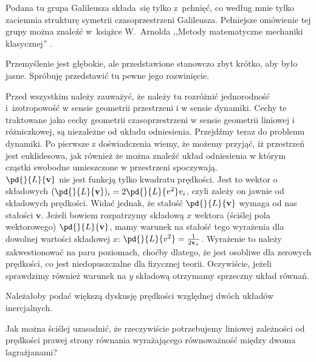\documentclass[a4paper,11pt]{article}
\begin{document}

\start {} Podana tu grupa Galileusza składa~się tylko z~pchnięć,
co według mnie tylko zaciemnia strukturę symetrii czasoprzestrzeni
Galileusza. Pełniejsze omówienie tej grupy można znaleźć w~książce
W.~Arnolda ,,Metody matematyczne mechaniki klasycznej''
\cite{ArnoldMetodyMatematyczneMechanikiKlasycznej1981}.

\vspace{\spaceFour}


\start {} Przemyślenie jest głębokie, ale przedstawione
stanowczo zbyt krótko, aby było jasne. Spróbuję przedstawić tu pewne
jego rozwinięcie.

Przed wszystkim należy zauważyć, że należy tu rozróżnić jednorodność
i~izotropowość w sensie geometrii przestrzeni i w sensie dynamiki.
Cechy te traktowane jako cechy geometrii czasoprzestrzeni w sensie
geometrii liniowej i różniczkowej, są niezależne od układu
odniesienia. Przejdźmy teraz do problemu dynamiki. Po pierwsze z
doświadczenia wiemy, że możemy przyjąć, iż przestrzeń jest
euklidesowa, jak również że można znaleźć układ odniesienia w którym
cząstki swobodne umieszczone w przestrzeni spoczywają. \\
\start {} $\pd{}{ L }{ \mathbf{ v } }$ nie jest funkcją tylko
kwadratu prędkości. Jest to wektor o składowych
$( \pd{}{ L }{ \mathbf{ v }} )_{ i } = 2 \pd{}{ L }{ { v^{ 2 } } } v_{
  i }$, czyli zależy on jawnie od składowych prędkości. Widać jednak,
że stałość $\pd{}{ L }{ \mathbf{ v } }$ wymaga od nas stałości
$\mathbf{ v }$. Jeżeli bowiem rozpatrzymy składową $x$ wektora
(ściślej pola wektorowego) $\pd{}{ L }{ \mathbf{ v } }$, mamy warunek
na stałość tego wyrażenia dla dowolnej wartości składowej $x$:
$\pd{}{ L }{ { v^{ 2 } } } = \frac{ 1 }{ 2 \mathbf{ v }_{ x } }$.
Wyrażenie to należy zakwestionować na paru poziomach, choćby dlatego,
że jest osobliwe dla zerowych prędkości, co jest niedopuszczalne dla
fizycznej teorii. Oczywiście, jeżeli sprawdzimy również warunek na
$ y $ składową otrzymamy sprzeczny układ równań.

\vspace{\spaceFour}


\start {} Należałoby podać większą dyskusję prędkości względnej
dwóch układów inercjalnych.

\vspace{\spaceFour}


\start {} Jak można ściślej uzasadnić, że rzeczywiście
potrzebujemy liniowej zależności od prędkości prawej strony równania
wyrażającego równoważność między dwoma lagrażjanami? \Dok
\end{document}
